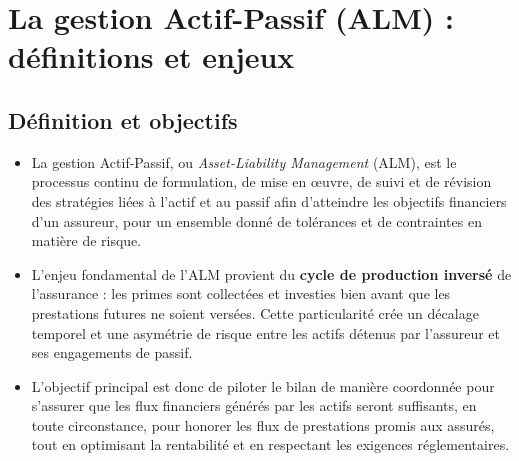 \section{La gestion Actif-Passif (ALM) : définitions et enjeux}
\label{sec:alm}

\subsection{Définition et objectifs}
\begin{itemize}
    \item La gestion Actif-Passif, ou \textit{Asset-Liability Management} (ALM), est le processus continu de formulation, de mise en œuvre, de suivi et de révision des stratégies liées à l'actif et au passif afin d'atteindre les objectifs financiers d'un assureur, pour un ensemble donné de tolérances et de contraintes en matière de risque. \newline{}
    \item L'enjeu fondamental de l'ALM provient du \textbf{cycle de production inversé} de l'assurance : les primes sont collectées et investies bien avant que les prestations futures ne soient versées. Cette particularité crée un décalage temporel et une asymétrie de risque entre les actifs détenus par l'assureur et ses engagements de passif. \newline{}
    \item L'objectif principal est donc de piloter le bilan de manière coordonnée pour s'assurer que les flux financiers générés par les actifs seront suffisants, en toute circonstance, pour honorer les flux de prestations promis aux assurés, tout en optimisant la rentabilité et en respectant les exigences réglementaires.
\end{itemize}

